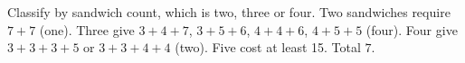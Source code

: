 Classify by sandwich count, which is two, three or four. Two sandwiches require $7+7$ (one). Three give $3+4+7$, $3+5+6$, $4+4+6$, $4+5+5$ (four). Four give $3+3+3+5$ or $3+3+4+4$ (two). Five cost at least 15. Total $\boxed7$.
